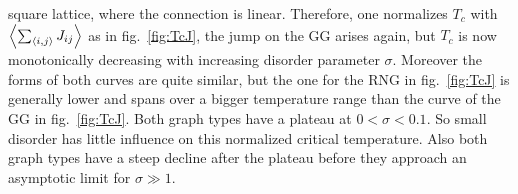     square lattice, where the connection is linear. Therefore, one
    normalizes \(T_c\) with \(\left< \sum_{\left< i,j \right>} J_{ij} \right>\) as in
    fig.\ \ref{fig:TcJ}, the
    jump on the GG arises again, but \(T_c\) is now monotonically
    decreasing with increasing disorder parameter \(\sigma\).
    Moreover the forms of both curves are quite similar, but the
    one for the RNG in fig.\ \ref{fig:TcJ}
    is generally lower and spans over a bigger temperature range than
    the curve of the GG in fig.\ \ref{fig:TcJ}.
    Both graph types have a plateau at \(0 < \sigma < 0.1\). So small
    disorder has little influence on this normalized critical temperature.
    Also both graph types have a steep decline after the plateau before
    they approach an asymptotic limit for \(\sigma \gg 1\).\\

